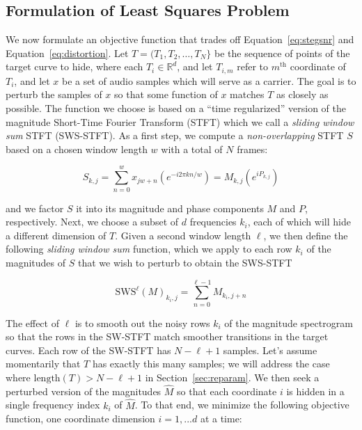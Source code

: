\documentclass[runningheads]{llncs}
\begin{document}
\subsection{Formulation of Least Squares Problem}
\label{sec:formulation}

We now formulate an objective function that trades off Equation~\ref{eq:stegsnr} and Equation~\ref{eq:distortion}.  Let $T = (T_1, T_2, \hdots, T_N \}$ be the sequence of points of the target curve to hide, where each $T_i \in \mathbb{R}^d$, and let $T_{i, m}$ refer to $m^{\text{th}}$ coordinate of $T_i$, and let $x$ be a set of audio samples which will serve as a carrier.  The goal is to perturb the samples of $x$ so that some function of $x$ matches $T$ as closely as possible.  The function we choose is based on a ``time regularized'' version of the magnitude Short-Time Fourier Transform (STFT) which we call a {\em sliding window sum} STFT (SWS-STFT).  As a first step, we compute a {\em non-overlapping} STFT $S$ based on a chosen window length $w$ with a total of $N$ frames:

\begin{equation}
  S_{k, j} = \sum_{n = 0}^w x_{jw + n} \left(e^{-i 2 \pi k n / w} \right) = M_{k, j} \left( e^{i P_{k, j}} \right)
\end{equation}

and we factor $S$ it into its magnitude and phase components $M$ and $P$, respectively.  Next, we choose a subset of $d$ frequencies $k_i$, each of which will hide a different dimension of $T$.  Given a second window length $\ell$, we then define the following {\em sliding window sum} function, which we apply to each row $k_i$ of the magnitudes of $S$ that we wish to perturb to obtain the SWS-STFT

\begin{equation}
  \text{SWS}^{\ell}(M)_{k_i, j} = \sum_{n = 0}^{\ell-1} M_{k_i, j+n}
\end{equation}

The effect of $\ell$ is to smooth out the noisy rows $k_i$ of the magnitude spectrogram so that the rows in the SW-STFT match smoother transitions in the target curves.  Each row of the SW-STFT has $N-\ell+1$ samples.  Let's assume momentarily that $T$ has exactly this many samples; we will address the case where $\text{length}(T) > N-\ell+1$ in Section~\ref{sec:reparam}.  We then seek a perturbed version of the magnitudes $\hat{M}$ so that each coordinate $i$ is hidden in a single frequency index $k_i$ of $\hat{M}$.  To that end, we minimize the following objective function, one coordinate dimension $i = 1, ... d$ at a time:
\end{document}
